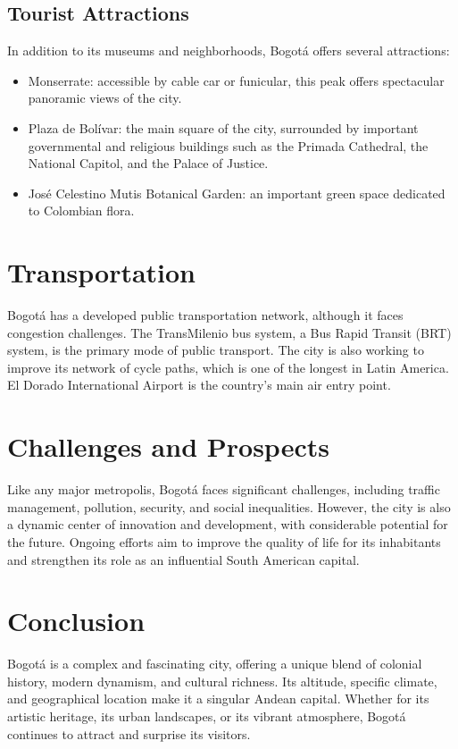 \documentclass{article}
\begin{document}
\subsection{Tourist Attractions}
In addition to its museums and neighborhoods, Bogotá offers several attractions:
\begin{itemize}
    \item Monserrate: accessible by cable car or funicular, this peak offers spectacular panoramic views of the city.
    \item Plaza de Bolívar: the main square of the city, surrounded by important governmental and religious buildings such as the Primada Cathedral, the National Capitol, and the Palace of Justice.
    \item José Celestino Mutis Botanical Garden: an important green space dedicated to Colombian flora.
\end{itemize}

\section{Transportation}
Bogotá has a developed public transportation network, although it faces congestion challenges. The TransMilenio bus system, a Bus Rapid Transit (BRT) system, is the primary mode of public transport. The city is also working to improve its network of cycle paths, which is one of the longest in Latin America. El Dorado International Airport is the country's main air entry point.

\section{Challenges and Prospects}
Like any major metropolis, Bogotá faces significant challenges, including traffic management, pollution, security, and social inequalities. However, the city is also a dynamic center of innovation and development, with considerable potential for the future. Ongoing efforts aim to improve the quality of life for its inhabitants and strengthen its role as an influential South American capital.

\section{Conclusion}
Bogotá is a complex and fascinating city, offering a unique blend of colonial history, modern dynamism, and cultural richness. Its altitude, specific climate, and geographical location make it a singular Andean capital. Whether for its artistic heritage, its urban landscapes, or its vibrant atmosphere, Bogotá continues to attract and surprise its visitors.
\end{document}
